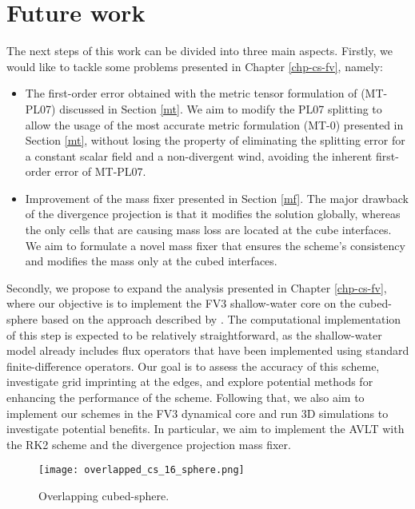 \section{Future work}
{
The next steps of this work can be divided into three main aspects.
Firstly, we would like to tackle some problems presented in Chapter \ref{chp-cs-fv}, namely:
\begin{itemize}
	\item The first-order error obtained with the metric tensor formulation of \citet{putman:2007} (MT-PL07) discussed in Section \ref{mt}.
	We aim to modify the PL07 splitting to allow the usage of the most accurate metric formulation (MT-0) presented in Section \ref{mt},
	without losing the property of eliminating the splitting error for a constant scalar field and a non-divergent wind, avoiding
	the inherent first-order error of MT-PL07.
	\item Improvement of the mass fixer presented in Section \ref{mf}. The major drawback of the divergence projection is that it modifies the solution globally,
	whereas the only cells that are causing mass loss are located at the cube interfaces.
	We aim to formulate a novel mass fixer that ensures the scheme's consistency and modifies the mass only at the cubed interfaces.
\end{itemize}
}

Secondly, we propose to expand the analysis presented in Chapter \ref{chp-cs-fv},
where our objective is to implement the FV3 shallow-water core on the cubed-sphere based on the approach described by \citet{lin:1997}.
The computational implementation of this step is expected to be relatively straightforward,
as the shallow-water model already includes flux operators that have been implemented using
standard finite-difference operators. Our goal is to assess the accuracy of this scheme,
investigate grid imprinting at the edges, and explore potential methods for enhancing the performance of the scheme.
{Following that, we also aim to implement our schemes in the FV3 dynamical core and run 3D simulations to investigate potential benefits.
In particular, we aim to implement the AVLT with the RK2 scheme and the divergence projection mass fixer.}
\begin{figure}[!htb]
	\centering
	\texttt{[image: overlapped\_cs\_16\_sphere.png]}
	\caption{Overlapping cubed-sphere.\label{gridoverlaped}}
\end{figure}

